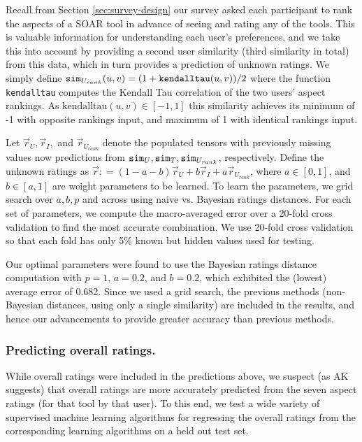 Recall from Section \ref{sec:survey-design} our survey asked each participant to rank the aspects of a SOAR tool in advance of seeing and rating any of the tools.
This is valuable information for understanding each user's preferences, and we take this into account by providing a second user similarity (third similarity in total) from this data, which in turn provides a prediction of unknown ratings. 
We simply define $\texttt{sim}_{U_{rank}}(u,v)= (1 + \texttt{kendalltau}(u,v) )/2$ where the function \texttt{kendalltau} computes the Kendall Tau correlation \cite{knight1966computer} of the two users' aspect rankings. 
As $\text{kendalltau}(u,v) \in [-1,1]$ this similarity achieves its minimum of -1 with opposite rankings input, and maximum of 1 with identical rankings input. 

Let $\vec{r}_U, \vec{r}_I,$ and $\vec{r}_{U_{rank}}$ denote the populated tensors with previously missing values now predictions from $\texttt{sim}_U, \texttt{sim}_T, \texttt{sim}_{U_{rank}}$, respectively. Define the unknown ratings as $\vec{r}: = (1-a-b) \vec{r}_U + b \vec{r}_I + a \vec{r}_{U_{rank}}$, where $a \in [0,1]$, and $b \in [a, 1]$ are weight parameters to be learned. 
To learn the parameters, we grid search over $a, b, p$ and across using naive vs. Bayesian ratings distances.
For each set of parameters, we compute the macro-averaged error over a 20-fold cross validation to find the most accurate combination. 
We use 20-fold cross validation so that each fold has only 5\% known but hidden values used for testing.%

Our optimal parameters were found to use the Bayesian ratings distance computation with $p=1$, $a = 0.2$, and $b = 0.2$, which exhibited the (lowest) average error of 0.682. 
Since we used a grid search, the previous methods (non-Bayesian distances, using only a single similarity) are included in the results, and hence our advancements to provide greater accuracy than previous methods. 

\subsubsection{Predicting overall ratings.}
While overall ratings were included in the predictions above, we suspect (as AK \cite{adomavicius2007new} suggests) that overall ratings are more accurately predicted from the seven aspect ratings (for that tool by that user). %
To this end, we test a wide variety of supervised machine learning algorithms for regressing the overall ratings from the corresponding learning algorithms on a held out test set. 

